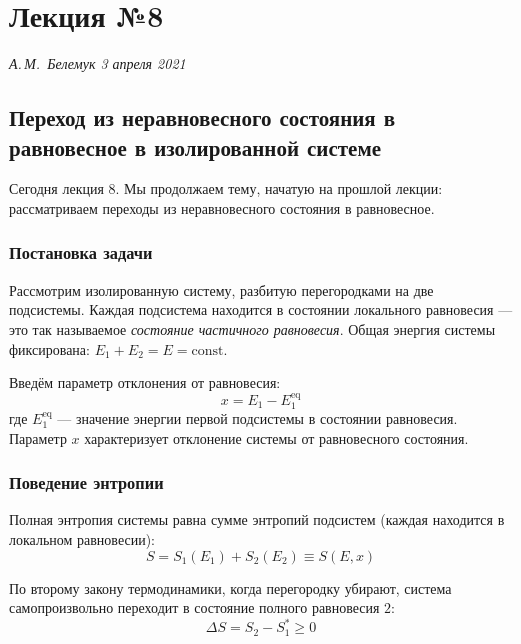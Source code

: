 \documentclass[../general/general]{subfiles}
\begin{document}
\chapter{Лекция №8}
\noindent\textit{А.\,М.~Белемук \hfill 3 апреля 2021}
\vspace{1em}
\ifSubfilesClassLoaded{\tableofcontents\newpage}{}


\section{Переход из неравновесного состояния в равновесное в изолированной системе}

Сегодня лекция 8. Мы продолжаем тему, начатую на прошлой лекции: рассматриваем переходы из неравновесного состояния в равновесное.

\subsection{Постановка задачи}

Рассмотрим изолированную систему, разбитую перегородками на две подсистемы. Каждая подсистема находится в состоянии локального равновесия --- это так называемое \emph{состояние частичного равновесия}. Общая энергия системы фиксирована: $E_1 + E_2 = E = \text{const}$.

Введём параметр отклонения от равновесия:
\begin{equation}
    x = E_1 - E_1^{\text{eq}}
\end{equation}
где $E_1^{\text{eq}}$ --- значение энергии первой подсистемы в состоянии равновесия. Параметр $x$ характеризует отклонение системы от равновесного состояния.

\subsection{Поведение энтропии}

Полная энтропия системы равна сумме энтропий подсистем (каждая находится в локальном равновесии):
\begin{equation}
    S = S_1(E_1) + S_2(E_2) \equiv S(E, x)
\end{equation}

По второму закону термодинамики, когда перегородку убирают, система самопроизвольно переходит в состояние полного равновесия $2$:
\begin{equation}
    \Delta S = S_2 - S_1^* \geq 0
\end{equation}
\end{document}
